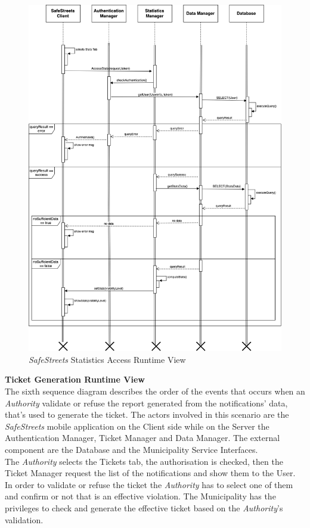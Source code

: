 \documentclass{article}
\begin{document}
	\begin{figure}[H]
			\centering
			\includegraphics[scale=0.31]{Images/Diagrams/Runtime/stats_runtime.png}
			\caption{{\it SafeStreets} Statistics Access Runtime View}
	\end{figure}
	\pagebreak
	\noindent
	{\bf Ticket Generation Runtime View} \\
	The sixth sequence diagram describes the order of the events that occurs when an {\it Authority} validate or refuse the report generated from the notifications' data, that's used to generate the ticket. The actors involved in this scenario are the {\it SafeStreets} mobile application on the Client side while on the Server the Authentication Manager, Ticket Manager and Data Manager. The external component are the Database and the Municipality Service Interfaces. \\
	The {\it Authority} selects the Tickets tab, the authorisation is checked, then the Ticket Manager request the list of the notifications and show them to the User. In order to validate or refuse the ticket the {\it Authority} has to select one of them and confirm or not that is an effective violation. The Municipality has the privileges to check and generate the effective ticket based on the {\it Authority}'s validation.
\end{document}
